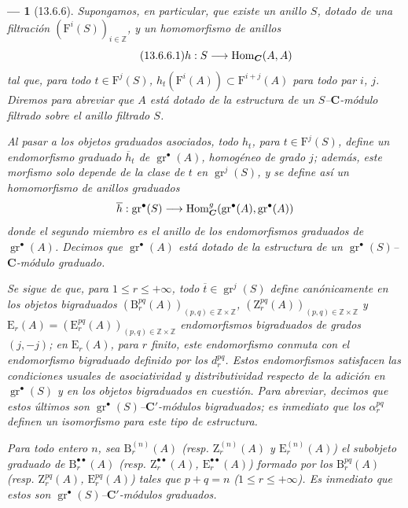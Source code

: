 \documentclass[10pt,oneside,openany]{book}
\theoremstyle{egaenv}\newtheorem*{env}{---}
\theoremstyle{egastatement}
\theoremstyle{egadescription}
\newcommand{\oldpage}[2][]{\marginnote{\normalfont\scriptsize\textbf{#1}\,|\,#2}\ignorespaces}
\renewcommand{\leq}{\leqslant}
\renewcommand{\to}{\mathchoice{\longrightarrow}{\rightarrow}{\rightarrow}{\rightarrow}}
\begin{document}
\begin{env}[13.6.6]
\label{0.13.6.6}
\label{0.13.6.6-fr}
Supongamos, en particular, que existe un anillo $S$, dotado de una
\emph{filtración} $(\mathrm F^i(S))_{i\in\mathbb Z}$, y un homomorfismo
de anillos
\begin{equation}
\label{0.13.6.6.1-fr}
\tag{13.6.6.1}
h:S\to\operatorname{Hom}_{\boldsymbol{C}}(A,A)
\end{equation}
\oldpage[0\textsubscript{III}]{75}
tal que, para todo $t\in\mathrm F^j(S)$,
$h_t(\mathrm F^i(A))\subset\mathrm F^{i+j}(A)$ para todo par $i$, $j$. Diremos para abreviar que $A$ está dotado de la estructura de un
\emph{$S$--$\boldsymbol{C}$-módulo filtrado} sobre el anillo filtrado $S$.

Al pasar a los objetos graduados asociados, todo $h_t$, para
$t\in\mathrm F^j(S)$, define un endomorfismo \emph{graduado}
$\overline h_t$ de $\operatorname{gr}^\bullet(A)$, homogéneo de grado $j$; además, este morfismo solo depende de la clase de $t$ en $\operatorname{gr}^j(S)$, y se define así un homomorfismo de \emph{anillos graduados} \[
\overline h:\operatorname{gr}^\bullet(S)\to
\operatorname{Hom}_{\boldsymbol{C}}^g(\operatorname{gr}^\bullet(A),
\operatorname{gr}^\bullet(A))
\] donde el segundo miembro es el anillo de los endomorfismos \emph{graduados} de $\operatorname{gr}^\bullet(A)$.
Decimos que $\operatorname{gr}^\bullet(A)$ está dotado de la estructura
de un \emph{$\operatorname{gr}^\bullet(S)$--$\boldsymbol{C}$-módulo graduado}.

Se sigue de  que, para
$1\leq r\leq+\infty$, todo $\overline t\in\operatorname{gr}^j(S)$ define canónicamente en los objetos bigraduados $(\mathrm B_r^{pq}(A))_{(p,q)\in\mathbb Z\times\mathbb Z}$, $(\mathrm Z_r^{pq}(A))_{(p,q)\in\mathbb Z\times\mathbb Z}$ y $\mathrm E_r(A)=(\mathrm E_r^{pq}(A))_{(p,q)\in\mathbb Z\times\mathbb Z}$ endomorfismos bigraduados de grados $(j,-j)$; en $\mathrm E_r(A)$, para $r$ finito, este endomorfismo conmuta con
el endomorfismo bigraduado definido por los $d_r^{pq}$.
Estos endomorfismos satisfacen las condiciones usuales de asociatividad y
distributividad respecto de la adición en
$\operatorname{gr}^\bullet(S)$ y en los objetos bigraduados en cuestión.
Para abreviar, decimos que estos últimos son
\emph{$\operatorname{gr}^\bullet(S)$--$\boldsymbol{C}'$-módulos bigraduados};
es inmediato que los $\alpha_r^{pq}$ definen un \emph{isomorfismo} para
este tipo de estructura.

Para todo entero $n$, sea $\mathrm B_r^{(n)}(A)$
(resp. $\mathrm Z_r^{(n)}(A)$ y
$\mathrm E_r^{(n)}(A)$) el subobjeto graduado de $\mathrm B_r^{\bullet\bullet}(A)$ (resp. $\mathrm Z_r^{\bullet\bullet}(A)$, $\mathrm E_r^{\bullet\bullet}(A)$) formado por los $\mathrm B_r^{pq}(A)$ (resp. $\mathrm Z_r^{pq}(A)$, $\mathrm E_r^{pq}(A)$) tales que $p+q=n$ ($1\leq r\leq+\infty$).
Es inmediato que estos son
\emph{$\operatorname{gr}^\bullet(S)$--$\boldsymbol{C}'$-módulos graduados}.


\end{env}
\end{document}

